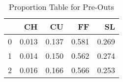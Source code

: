 \begin{table}[ht]
\centering
\begin{tabular}{rrrrr}
  \hline
 & CH & CU & FF & SL \\ 
  \hline
0 & 0.013 & 0.137 & 0.581 & 0.269 \\ 
  1 & 0.014 & 0.150 & 0.562 & 0.274 \\ 
  2 & 0.016 & 0.166 & 0.566 & 0.253 \\ 
   \hline
\end{tabular}
\caption{Proportion Table for Pre-Outs} 
\end{table}
